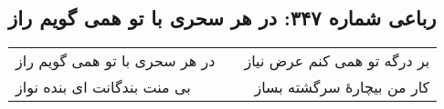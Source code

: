 \begin{center}
\section*{رباعی شماره ۳۴۷: در هر سحری با تو همی گویم راز}
\label{sec:sh347}
\begin{longtable}{l p{0.5cm} r}
در هر سحری با تو همی گویم راز
&&
بر درگه تو همی کنم عرض نیاز
\\
بی منت بندگانت ای بنده نواز
&&
کار من بیچارهٔ سرگشته بساز
\\
\end{longtable}
\end{center}
